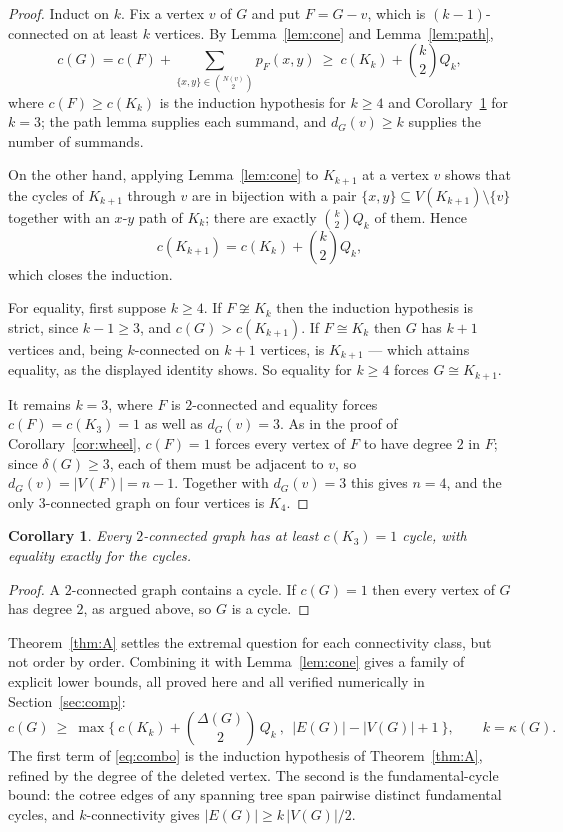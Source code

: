 \documentclass[11pt,a4paper]{article}
\newtheorem{corollary}[theorem]{Corollary}
\theoremstyle{definition}
\newcommand{\cF}{c(F)}
\newcommand{\KZ}{K_{k+1}}
\begin{document}
\begin{proof}
Induct on $k$.  Fix a vertex $v$ of $G$ and put $F=G-v$, which is
$(k-1)$-connected on at least $k$ vertices.  By Lemma~\ref{lem:cone} and
Lemma~\ref{lem:path},
\[
  c(G) = \cF + \sum_{\{x,y\}\in\binom{N(v)}{2}} p_F(x,y)
       \ \ge\ c(K_k) + \binom{k}{2}Q_k ,
\]
where $\cF\ge c(K_k)$ is the induction hypothesis for $k\ge 4$ and
Corollary~\ref{cor:k2} for $k=3$; the path lemma supplies each summand, and
$d_G(v)\ge k$ supplies the number of summands.

On the other hand, applying Lemma~\ref{lem:cone} to $K_{k+1}$ at a vertex $v$
shows that the cycles of $K_{k+1}$ through $v$ are in bijection with a pair
$\{x,y\}\subseteq V(K_{k+1})\setminus\{v\}$ together with an $x$-$y$ path of
$K_k$; there are exactly $\binom{k}{2}Q_k$ of them.  Hence
\[
  c(\KZ) = c(K_k) + \binom{k}{2}Q_k ,
\]
which closes the induction.

For equality, first suppose $k\ge 4$.  If $F\not\cong K_k$ then the induction
hypothesis is strict, since $k-1\ge 3$, and $c(G) > c(\KZ)$.  If $F\cong
K_k$ then $G$ has $k+1$ vertices and, being $k$-connected on $k+1$ vertices,
is $K_{k+1}$ --- which attains equality, as the displayed identity shows.  So
equality for $k\ge 4$ forces $G\cong\KZ$.

It remains $k=3$, where $F$ is $2$-connected and equality forces
$\cF = c(K_3)=1$ as well as $d_G(v)=3$.  As in the proof of
Corollary~\ref{cor:wheel}, $\cF=1$ forces every vertex of $F$ to have degree
$2$ in $F$; since $\delta(G)\ge 3$, each of them must be adjacent to $v$, so
$d_G(v)=|V(F)|=n-1$.  Together with $d_G(v)=3$ this gives $n=4$, and the only
$3$-connected graph on four vertices is $K_4$.
\end{proof}

\begin{corollary}\label{cor:k2}
Every $2$-connected graph has at least $c(K_3)=1$ cycle, with equality exactly
for the cycles.
\end{corollary}

\begin{proof}
A $2$-connected graph contains a cycle.  If $c(G)=1$ then every vertex of $G$
has degree $2$, as argued above, so $G$ is a cycle.
\end{proof}

Theorem~\ref{thm:A} settles the extremal question for each connectivity class,
but not order by order.  Combining it with Lemma~\ref{lem:cone} gives a family
of explicit lower bounds, all proved here and all verified numerically in
Section~\ref{sec:comp}:
\begin{equation}\label{eq:combo}
  c(G)\ \ge\ \max\Big\{\ c(K_k)+\binom{\Delta(G)}{2}\,Q_k\ ,\ \ |E(G)|-|V(G)|+1\ \Big\},
  \qquad k=\kappa(G).
\end{equation}
The first term of \eqref{eq:combo} is the induction hypothesis of
Theorem~\ref{thm:A}, refined by the degree of the deleted vertex.  The second is
the fundamental-cycle bound: the cotree edges of any spanning tree span
pairwise distinct fundamental cycles, and $k$-connectivity gives
$|E(G)|\ge k\,|V(G)|/2$.
\end{document}
